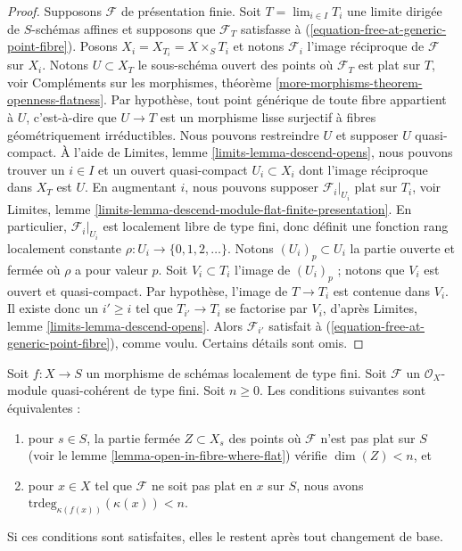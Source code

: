 \begin{proof}
\medskip\noindent
Supposons $\mathcal{F}$ de présentation finie.
Soit $T = \lim_{i \in I} T_i$ une limite dirigée de $S$-schémas affines
et supposons que $\mathcal{F}_T$ satisfasse à
(\ref{equation-free-at-generic-point-fibre}).
Posons $X_i = X_{T_i} = X \times_S T_i$ et notons $\mathcal{F}_i$
l'image réciproque de $\mathcal{F}$ sur $X_i$.
Notons $U \subset X_T$ le sous-schéma ouvert des points où
$\mathcal{F}_T$ est plat sur $T$, voir
Compléments sur les morphismes, théorème \ref{more-morphisms-theorem-openness-flatness}.
Par hypothèse, tout point générique de toute fibre appartient à $U$, c'est-à-dire que
$U \to T$ est un morphisme lisse surjectif à fibres géométriquement irréductibles.
Nous pouvons restreindre $U$ et supposer $U$ quasi-compact.
À l'aide de
Limites, lemme \ref{limits-lemma-descend-opens},
nous pouvons trouver un $i \in I$ et un ouvert quasi-compact $U_i \subset X_i$
dont l'image réciproque dans $X_T$ est $U$. En augmentant $i$, nous pouvons
supposer $\mathcal{F}_i|_{U_i}$ plat sur $T_i$, voir
Limites, lemme \ref{limits-lemma-descend-module-flat-finite-presentation}.
En particulier, $\mathcal{F}_i|_{U_i}$ est localement libre de type fini,
donc définit une fonction rang
localement constante $\rho : U_i \to \{0, 1, 2, \ldots \}$.
Notons $(U_i)_p \subset U_i$ la partie ouverte et fermée
où $\rho$ a pour valeur $p$. Soit $V_i \subset T_i$
l'image de $(U_i)_p$ ; notons que $V_i$ est ouvert et quasi-compact.
Par hypothèse, l'image de $T \to T_i$ est contenue dans $V_i$.
Il existe donc un $i' \geq i$ tel que $T_{i'} \to T_i$ se factorise
par $V_i$, d'après
Limites, lemme \ref{limits-lemma-descend-opens}.
Alors $\mathcal{F}_{i'}$ satisfait à (\ref{equation-free-at-generic-point-fibre}),
comme voulu. Certains détails sont omis.
\end{proof}

\begin{lemma}
\label{lemma-pre-flat-dimension-n}
Soit $f : X \to S$ un morphisme de schémas localement de type fini.
Soit $\mathcal{F}$ un $\mathcal{O}_X$-module quasi-cohérent de type
fini. Soit $n \geq 0$. Les conditions suivantes sont équivalentes :
\begin{enumerate}
\item pour $s \in S$, la partie fermée $Z \subset X_s$ des points
où $\mathcal{F}$ n'est pas plat sur $S$ (voir le
lemme \ref{lemma-open-in-fibre-where-flat})
vérifie $\dim(Z) < n$, et
\item pour $x \in X$ tel que $\mathcal{F}$ ne soit pas plat en $x$
sur $S$, nous avons $\text{trdeg}_{\kappa(f(x))}(\kappa(x)) < n$.
\end{enumerate}
Si ces conditions sont satisfaites, elles le restent après tout changement de base.
\end{lemma}

